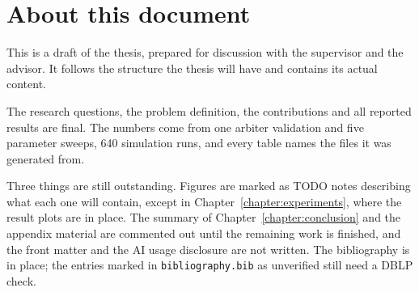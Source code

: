 \chapter*{About this document}

This is a draft of the thesis, prepared for discussion with the supervisor
and the advisor. It follows the structure the thesis will have and
contains its actual content.

The research questions, the problem definition, the contributions
and all reported results are final. The numbers come from one arbiter
validation and five parameter sweeps, 640 simulation runs, and every table
names the files it was generated from.

Three things are still outstanding. Figures are marked as TODO notes
describing what each one will contain, except in
Chapter~\ref{chapter:experiments}, where the result plots are in place.
The summary of Chapter~\ref{chapter:conclusion} and the appendix material
are commented out until the remaining work is finished, and the front
matter and the AI usage disclosure are not written. The bibliography is in
place; the entries marked in \texttt{bibliography.bib} as unverified still
need a DBLP check.
